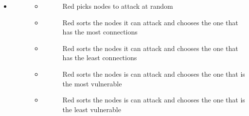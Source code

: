 \documentclass[letterpaper,10pt,english]{sphinxmanual}
\begin{document}
\begin{itemize}
\item {} \begin{description}
\item[{}] \leavevmode\begin{itemize}
\item {} \begin{description}
\item[{}] \leavevmode
\sphinxAtStartPar
Red picks nodes to attack at random

\end{description}

\item {} \begin{description}
\item[{}] \leavevmode
\sphinxAtStartPar
Red sorts the nodes it can attack and chooses the one that has the most connections

\end{description}

\item {} \begin{description}
\item[{}] \leavevmode
\sphinxAtStartPar
Red sorts the nodes it can attack and chooses the one that has the least connections

\end{description}

\item {} \begin{description}
\item[{}] \leavevmode
\sphinxAtStartPar
Red sorts the nodes is can attack and chooses the one that is the most vulnerable

\end{description}

\item {} \begin{description}
\item[{}] \leavevmode
\sphinxAtStartPar
Red sorts the nodes is can attack and chooses the one that is the least vulnerable

\end{description}

\end{itemize}

\end{description}

\end{itemize}
\end{document}

